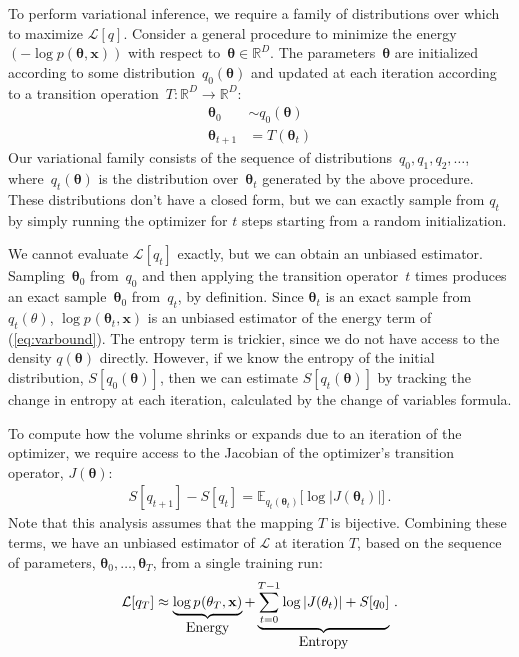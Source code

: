 \documentclass{article} %
\newcommand{\vx}{\mathbf{x}}
\newcommand{\expect}{\mathbb{E}}
\newcommand{\varL}{\mathcal{L}}
\newcommand{\data}{\vx}
\newcommand{\params}{\mathbf{\theta}}
\newcommand{\trans}{T}
\newcommand{\jointdist}{p(\params , \data)}
\newcommand{\subjointdist}[2]{p_{#1}(\params_{#2} , \data)}
\newcommand{\reals}{\mathbb{R}}
\begin{document}
To perform variational inference, we require a family of distributions over which to maximize $\varL[q]$. 
Consider a general procedure to minimize the energy~$(-\log\jointdist)$ with respect to~${\params \in \reals^D}$.
The parameters~$\params$ are initialized according to some distribution~$q_0(\params)$ and updated at each iteration according to a transition operation~${\trans : \reals^D \rightarrow \reals^D}$:
%
\begin{align}
\params_0 &\sim q_0(\params) \\
\params_{t + 1} &= \trans(\params_t)
\end{align}
%
Our variational family consists of the sequence of distributions~$q_0, q_1, q_2, \ldots$,
where~$q_t(\params)$ is the distribution over~$\params_t$ generated by the above procedure.
These distributions don't have a closed form, but we can exactly sample from $q_t$ by simply running the optimizer for $t$ steps starting from a random initialization.

We cannot evaluate $\varL[q_t]$ exactly, but we can obtain an unbiased estimator.
Sampling~$\params_0$ from~$q_0$ and then applying the transition operator~$t$ times produces an exact sample~$\params_0$ from~$q_t$, by definition.
Since $\params_t$ is an exact sample from $q_t(\theta)$, $\log\subjointdist{}{t}$ is an unbiased estimator of the energy term of (\ref{eq:varbound}).
The entropy term is trickier, since we do not have access to the density $q(\params)$ directly.
However, if we know the entropy of the initial distribution, $S[q_0(\params)]$, then we can estimate $S[q_t(\params)]$ by tracking the change in entropy at each iteration, calculated by the change of variables formula. %

To compute how the volume shrinks or expands due to an iteration of the optimizer, we require access to the Jacobian of the optimizer's transition operator, $J(\params)$:
%
\begin{align}
S[q_{t+1}] - S[q_t] =
  \expect_{q_t(\params_t)} \big[ \log
    \left| J(\params_t) \right| \big] \,.
\end{align}
%
Note that this analysis assumes that the mapping $T$ is bijective.
Combining these terms, we have an unbiased estimator of $\varL$ at iteration $T$,
based on the sequence of parameters, $\params_0, \ldots, \params_T$, from a single training run:
%
\begin{align}
\varL[q_T] \approx
  \underbrace{\log \subjointdist{}{T}}_{\textnormal{\normalsize Energy}} +
  \underbrace{\sum_{t=0}^{T-1} \log \left| J(\params_t) \right| + S[q_0]}_{\textnormal{\normalsize Entropy}} \,.
\label{eq:entropy-bound}
\end{align}
\end{document}
